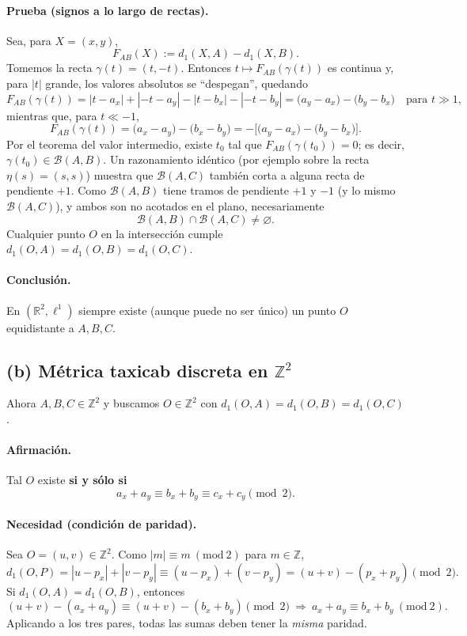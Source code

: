 \documentclass[12pt]{article}
\begin{document}
\paragraph{Prueba (signos a lo largo de rectas).}
Sea, para $X=(x,y)$,
\[
F_{AB}(X):=d_1(X,A)-d_1(X,B).
\]
Tomemos la recta $\gamma(t)=(t,-t)$. Entonces $t\mapsto F_{AB}(\gamma(t))$ es continua y,
para $|t|$ grande, los valores absolutos se “despegan”, quedando
\[
F_{AB}(\gamma(t))=
|t-a_x|+|-t-a_y|-|t-b_x|-|-t-b_y|
=
\big(a_y-a_x\big)-\big(b_y-b_x\big)\quad\text{para }t\gg 1,
\]
mientras que, para $t\ll -1$,
\[
F_{AB}(\gamma(t))=
\big(a_x-a_y\big)-\big(b_x-b_y\big)
= -\Big[\big(a_y-a_x\big)-\big(b_y-b_x\big)\Big].
\]
Por el teorema del valor intermedio, existe $t_0$ tal que $F_{AB}(\gamma(t_0))=0$; es decir,
$\gamma(t_0)\in\mathcal{B}(A,B)$. Un razonamiento idéntico (por ejemplo sobre la recta
$\eta(s)=(s,s)$) muestra que $\mathcal{B}(A,C)$ también corta a alguna recta de pendiente $+1$.
Como $\mathcal{B}(A,B)$ tiene tramos de pendiente $+1$ y $-1$ (y lo mismo $\mathcal{B}(A,C)$),
y ambos son no acotados en el plano, necesariamente
\[
\mathcal{B}(A,B)\cap\mathcal{B}(A,C)\neq\varnothing.
\]
Cualquier punto $O$ en la intersección cumple $d_1(O,A)=d_1(O,B)=d_1(O,C)$.

\paragraph{Conclusión.}
En $(\mathbb{R}^2,\ell^1)$ siempre existe (aunque puede no ser único) un punto
$O$ equidistante a $A,B,C$.

\subsection*{(b) Métrica taxicab discreta en $\mathbb{Z}^2$}
Ahora $A,B,C\in\mathbb{Z}^2$ y buscamos $O\in\mathbb{Z}^2$ con
$d_1(O,A)=d_1(O,B)=d_1(O,C)$.

\paragraph{Afirmación.}
Tal $O$ existe \textbf{si y sólo si}
\[
a_x+a_y\equiv b_x+b_y\equiv c_x+c_y \pmod 2.
\]

\paragraph{Necesidad (condición de paridad).}
Sea $O=(u,v)\in\mathbb{Z}^2$. Como $|m|\equiv m\ (\mathrm{mod}\ 2)$ para $m\in\mathbb{Z}$,
\[
d_1(O,P)=|u-p_x|+|v-p_y|\equiv (u-p_x)+(v-p_y)=
(u+v)-(p_x+p_y)\pmod 2.
\]
Si $d_1(O,A)=d_1(O,B)$, entonces
\[
(u+v)-(a_x+a_y)\equiv (u+v)-(b_x+b_y)\pmod 2
\ \Rightarrow\ 
a_x+a_y\equiv b_x+b_y\ (\mathrm{mod}\ 2).
\]
Aplicando a los tres pares, todas las sumas deben tener la \emph{misma} paridad.
\end{document}
